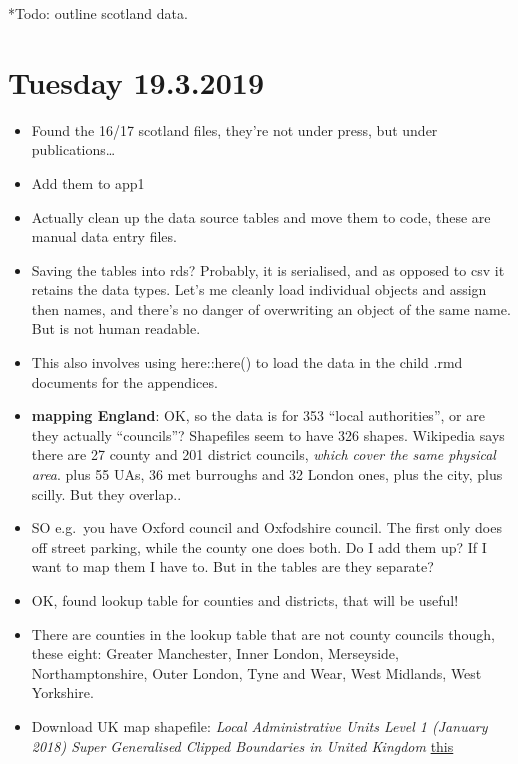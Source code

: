 \documentclass[]{article}
\begin{document}
*Todo: outline scotland data.

\hypertarget{tuesday-19.3.2019}{%
\section{Tuesday 19.3.2019}\label{tuesday-19.3.2019}}

\begin{itemize}
\item
  Found the 16/17 scotland files, they're not under press, but under
  publications\ldots{}
\item
  Add them to app1
\item
  Actually clean up the data source tables and move them to code, these
  are manual data entry files.
\item
  Saving the tables into rds? Probably, it is serialised, and as opposed
  to csv it retains the data types. Let's me cleanly load individual
  objects and assign then names, and there's no danger of overwriting an
  object of the same name. But is not human readable.
\item
  This also involves using here::here() to load the data in the child
  .rmd documents for the appendices.
\item
  \textbf{mapping England}: OK, so the data is for 353 ``local
  authorities'', or are they actually ``councils''? Shapefiles seem to
  have 326 shapes. Wikipedia says there are 27 county and 201 district
  councils, \emph{which cover the same physical area}. plus 55 UAs, 36
  met burroughs and 32 London ones, plus the city, plus scilly. But they
  overlap..
\item
  SO e.g.~you have Oxford council and Oxfodshire council. The first only
  does off street parking, while the county one does both. Do I add them
  up? If I want to map them I have to. But in the tables are they
  separate?
\item
  OK, found lookup table for counties and districts, that will be
  useful!
\item
  There are counties in the lookup table that are not county councils
  though, these eight: Greater Manchester, Inner London, Merseyside,
  Northamptonshire, Outer London, Tyne and Wear, West Midlands, West
  Yorkshire.
\item
  Download UK map shapefile: \emph{Local Administrative Units Level 1
  (January 2018) Super Generalised Clipped Boundaries in United Kingdom
  }
  \href{https://data.gov.uk/dataset/e892da8a-bf06-4d00-a8fd-a578b30b1dca/local-administrative-units-level-1-january-2018-super-generalised-clipped-boundaries-in-united-kingdom}{this
}
\end{itemize}
\end{document}
